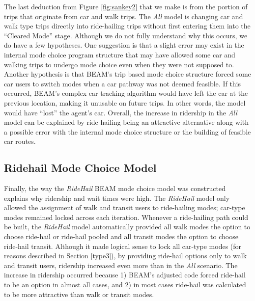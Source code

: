 \documentclass[fancy, masters]{byuthesis}
\begin{document}
The last deduction from Figure \ref{fig:sankey2} that we make is from the portion of trips that originate from car and walk trips. The \emph{All} model is changing car and walk type trips directly into ride-hailing trips without first entering them into the ``Cleared Mode'' stage. Although we do not fully understand why this occurs, we do have a few hypotheses. One suggestion is that a slight error may exist in the internal mode choice program structure that may have allowed some car and walking trips to undergo mode choice even when they were not supposed to. Another hypothesis is that BEAM's trip based mode choice structure forced some car users to switch modes when a car pathway was not deemed feasible. If this occurred, BEAM's complex car tracking algorithm would have left the car at the previous location, making it unusable on future trips. In other words, the model would have ``lost'' the agent's car. Overall, the increase in ridership in the \emph{All} model can be explained by ride-hailing being an attractive alternative along with a possible error with the internal mode choice structure or the building of feasible car routes.

\hypertarget{type2}{%
\subsection{Ridehail Mode Choice Model}\label{type2}}

Finally, the way the \emph{RideHail} BEAM mode choice model was constructed explains why ridership and wait times were high. The \emph{RideHail} model only allowed the assignment of walk and transit users to ride-hailing modes; car-type modes remained locked across each iteration. Whenever a ride-hailing path could be built, the \emph{RideHail} model automatically provided all walk modes the option to choose ride-hail or ride-hail pooled and all transit modes the option to choose ride-hail transit. Although it made logical sense to lock all car-type modes (for reasons described in Section \ref{type3}), by providing ride-hail options only to walk and transit users, ridership increased even more than in the \emph{All} scenario. The increase in ridership occurred because 1) BEAM's adjusted code forced ride-hail to be an option in almost all cases, and 2) in most cases ride-hail was calculated to be more attractive than walk or transit modes.
\end{document}
